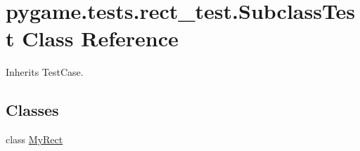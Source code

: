 \hypertarget{classpygame_1_1tests_1_1rect__test_1_1_subclass_test}{}\section{pygame.\+tests.\+rect\+\_\+test.\+Subclass\+Test Class Reference}
\label{classpygame_1_1tests_1_1rect__test_1_1_subclass_test}


Inherits Test\+Case.

\subsection*{Classes}
\begin{DoxyCompactItemize}
\item 
class \hyperlink{classpygame_1_1tests_1_1rect__test_1_1_subclass_test_1_1_my_rect}{My\+Rect}
\end{DoxyCompactItemize}
